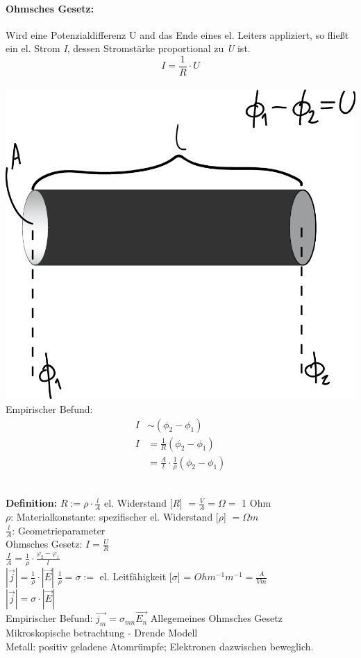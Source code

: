 \documentclass[11pt]{article}
\newcommand{\definition}{\\ \textbf{Definition:} \hspace{1cm} }
\begin{document}
		\paragraph{Ohmsches Gesetz:} Wird eine Potenzialdifferenz U and das Ende eines el. Leiters appliziert, so fließt ein el. Strom \emph{I}, dessen Stromstärke proportional zu \emph{U} ist. \\
		{\large $$\boxed{ I = \frac{1}{R} \cdot U }$$} \\
		\includegraphics[width=0.8\linewidth]{skizzen/15/VL06/15_4} \\
		Empirischer Befund:
		\begin{align*}
		I &\sim (\phi_2-\phi_1) \\
		I &=\frac{1}{R} (\phi_2-\phi_1) \\
		&= \frac{A}{l} \cdot \frac{1}{\rho} (\phi_2-\phi_1)
		\end{align*}
		
		\noindent \definition $\boxed{R:= \rho \cdot \frac{l}{A}}$ el. Widerstand [\emph{R}] $= \frac{V}{A} = \Omega =$ 1 Ohm \\
		$\rho$: Materialkonstante: spezifischer el. Widerstand [$\rho$] $=\Omega m$ \\
		$\frac{l}{A}$: Geometrieparameter \\
		{\large Ohmsches Gesetz: $\boxed{I=\frac{U}{R}}$} \\
		$\frac{I}{A}=\frac{1}{\rho }\cdot \frac{{\varphi }_{2}-{\varphi }_{1}}{l}$ \\
		$\left|\vec{j}\right|=\frac{1}{\rho }\cdot \left|\vec{E}\right|$ \hspace{2cm} $\frac{1}{\rho} = \sigma := $ el. Leitfähigkeit [$\sigma$] = $Ohm^{-1} m^{-1} = \frac{A}{Vm}$ \\
		$|\vec{j}| = \sigma \cdot |\vec{E}|$ \\
		Empirischer Befund: $\boxed{\vec{j_m} = \sigma_{mn} \vec{E_n} }$ Allegemeines Ohmsches Gesetz\\
		\newpage
		\noindent Mikroskopische betrachtung - Drende Modell \\
		Metall: positiv geladene Atomrümpfe; Elektronen dazwischen beweglich. \\
		
\end{document}
